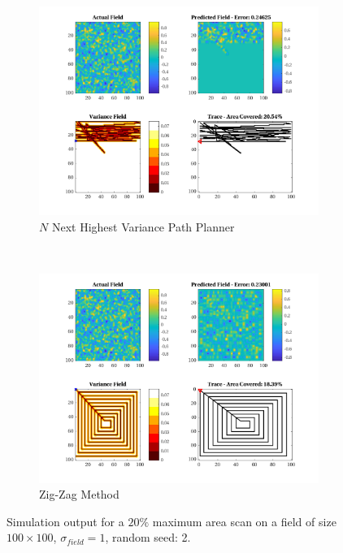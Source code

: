 \begin{figure}[htb!]
\begin{subfigure}[t]{0.5\textwidth}
    \end{subfigure}%
    \\
    \begin{subfigure}[t]{0.5\textwidth}
        \centering
        \includegraphics[width=\linewidth]{figures/hbresults/nnhv_20p_100x100_sf_1_seed_2.png}
        \captionsetup{skip=0.10\baselineskip,size=footnotesize}
        \caption{$N$ Next Highest Variance Path Planner}
    \end{subfigure}%
    ~
    \begin{subfigure}[t]{0.5\textwidth}
        \centering
        \includegraphics[width=\linewidth]{figures/hbresults/zz_20p_100x100_sf_1_seed_2.png}
        \captionsetup{skip=0.10\baselineskip,size=footnotesize}
        \caption{Zig-Zag Method}
    \end{subfigure}%
    \captionsetup{skip=0.20\baselineskip}
    \caption{Simulation output for a $20\%$ maximum area scan on a field of size $100 \times 100$, $\sigma_{field} = 1$, random seed: 2.}
    \label{fig:sim_sigma1_p20_s2}
\end{figure}


